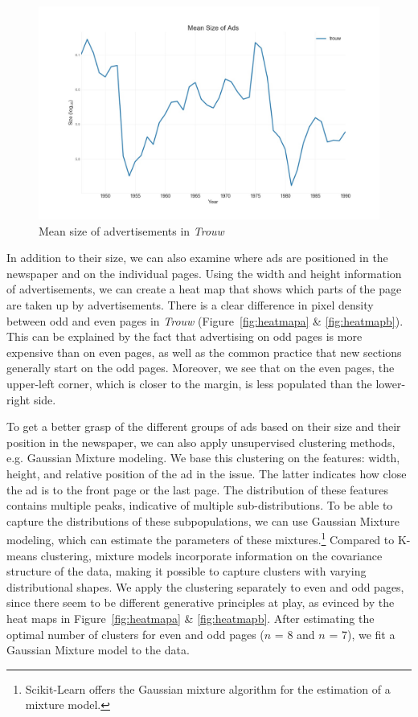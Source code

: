 \documentclass[USenglish]{article}
\begin{document}
\begin{figure}%
  \centering
  \includegraphics[width=.9\textwidth]{figures/mean_size}%
  \caption{Mean size of advertisements in \textit{Trouw}}
  \label{fig:mean_size}%
\end{figure}


In addition to their size, we can also examine where ads are positioned in the newspaper and on the individual pages. Using the width and height information of advertisements, we can create a heat map that shows which parts of the page are taken up by advertisements. There is a clear difference in pixel density between odd and even pages in \textit{Trouw} (Figure~\ref{fig:heatmapa} \& \ref{fig:heatmapb}). This can be explained by the fact that advertising on odd pages is more expensive than on even pages, as well as the common practice that new sections generally start on the odd pages. Moreover, we see that on the even pages, the upper-left corner, which is closer to the margin, is less populated than the lower-right side. 

To get a better grasp of the different groups of ads based on their 
size and their position in the newspaper, we can also apply unsupervised clustering methods, e.g. Gaussian Mixture modeling. We base this clustering on the features: width, height, and relative position of the ad in the issue. The latter indicates how close the ad is to the front page or the last page. The distribution of these features contains multiple peaks, indicative of multiple sub-distributions. To be able to capture the distributions of these subpopulations, we can use Gaussian Mixture modeling, which can estimate the parameters of these mixtures.\footnote{Scikit-Learn offers the Gaussian mixture algorithm for the estimation of a mixture model.} Compared to K-means clustering, mixture models incorporate information on the covariance structure of the data, making it possible to capture clusters with varying distributional shapes. We apply the clustering separately to even and odd pages, since there seem to be different generative principles at play, as evinced by the heat maps in Figure~\ref{fig:heatmapa} \& \ref{fig:heatmapb}. After estimating the optimal number of clusters for even and odd pages ($n$ = 8 and $n$ = 7), we fit a Gaussian Mixture model to the data.
\end{document}
